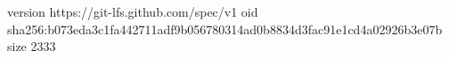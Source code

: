 version https://git-lfs.github.com/spec/v1
oid sha256:b073eda3c1fa442711adf9b056780314ad0b8834d3fac91e1cd4a02926b3e07b
size 2333
